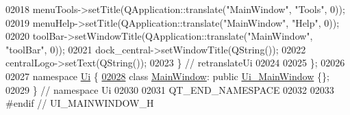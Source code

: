 \begin{DoxyCode}
02018         menuTools->setTitle(QApplication::translate(\textcolor{stringliteral}{"MainWindow"}, \textcolor{stringliteral}{"Tools"}, 0));
02019         menuHelp->setTitle(QApplication::translate(\textcolor{stringliteral}{"MainWindow"}, \textcolor{stringliteral}{"Help"}, 0));
02020         toolBar->setWindowTitle(QApplication::translate(\textcolor{stringliteral}{"MainWindow"}, \textcolor{stringliteral}{"toolBar"}, 0));
02021         dock\_central->setWindowTitle(QString());
02022         centralLogo->setText(QString());
02023     \} \textcolor{comment}{// retranslateUi}
02024 
02025 \};
02026 
02027 \textcolor{keyword}{namespace }\hyperlink{a00055}{Ui} \{
\hypertarget{a00052_source_l02028}{}\hyperlink{a00007}{02028}     \textcolor{keyword}{class }\hyperlink{a00007}{MainWindow}: \textcolor{keyword}{public} \hyperlink{a00027}{Ui\_MainWindow} \{\};
02029 \} \textcolor{comment}{// namespace Ui}
02030 
02031 QT\_END\_NAMESPACE
02032 
02033 \textcolor{preprocessor}{#endif // UI\_MAINWINDOW\_H}
\end{DoxyCode}
